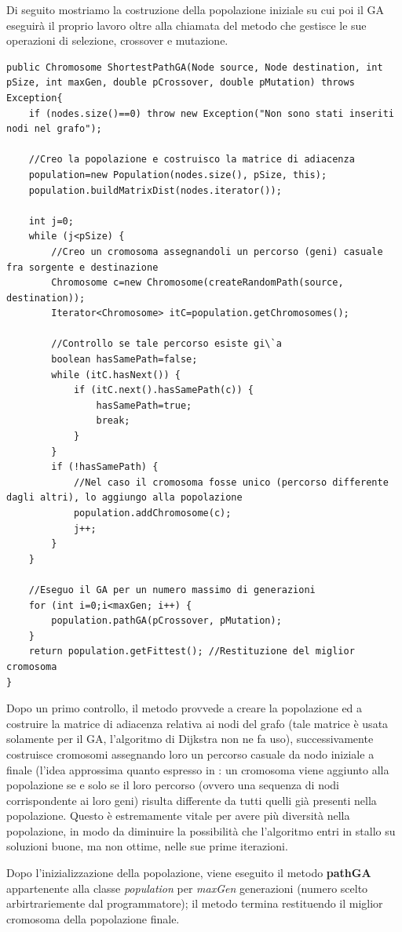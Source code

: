 Di seguito mostriamo la costruzione della popolazione iniziale su cui poi il GA eseguir\`a il proprio lavoro oltre alla chiamata del metodo che gestisce le sue operazioni di selezione, crossover e mutazione.
\begin{lstlisting}[style=Java]
public Chromosome ShortestPathGA(Node source, Node destination, int pSize, int maxGen, double pCrossover, double pMutation) throws Exception{
	if (nodes.size()==0) throw new Exception("Non sono stati inseriti nodi nel grafo");
	
	//Creo la popolazione e costruisco la matrice di adiacenza
	population=new Population(nodes.size(), pSize, this);
	population.buildMatrixDist(nodes.iterator());
	
	int j=0;
	while (j<pSize) {
		//Creo un cromosoma assegnandoli un percorso (geni) casuale fra sorgente e destinazione
		Chromosome c=new Chromosome(createRandomPath(source, destination));
		Iterator<Chromosome> itC=population.getChromosomes();
		
		//Controllo se tale percorso esiste gi\`a
		boolean hasSamePath=false;
		while (itC.hasNext()) {
			if (itC.next().hasSamePath(c)) {
				hasSamePath=true;
				break;
			}
		}
		if (!hasSamePath) {
			//Nel caso il cromosoma fosse unico (percorso differente dagli altri), lo aggiungo alla popolazione
			population.addChromosome(c);
			j++;
		}
	}
	
	//Eseguo il GA per un numero massimo di generazioni
	for (int i=0;i<maxGen; i++) {
		population.pathGA(pCrossover, pMutation);
	}
	return population.getFittest(); //Restituzione del miglior cromosoma
}
\end{lstlisting}
Dopo un primo controllo, il metodo provvede a creare la popolazione ed a costruire la matrice di adiacenza relativa ai nodi del grafo (tale matrice \`e usata solamente per il GA, l'algoritmo di Dijkstra non ne fa uso), successivamente costruisce cromosomi assegnando loro un percorso casuale da nodo iniziale a finale (l'idea approssima quanto espresso in \cite{path3}: un cromosoma viene aggiunto alla popolazione se e solo se il loro percorso (ovvero una sequenza di nodi corrispondente ai loro geni) risulta differente da tutti quelli gi\`a presenti nella popolazione. Questo \`e estremamente vitale per avere pi\`u diversit\`a nella popolazione, in modo da diminuire la possibilit\`a che l'algoritmo entri in stallo su soluzioni buone, ma non ottime, nelle sue prime iterazioni.

Dopo l'inizializzazione della popolazione, viene eseguito il metodo \textbf{pathGA} appartenente alla classe \textit{population} per \textit{maxGen} generazioni (numero scelto arbirtrariemente dal programmatore); il metodo termina restituendo il miglior cromosoma della popolazione finale.
\vspace{3mm}

